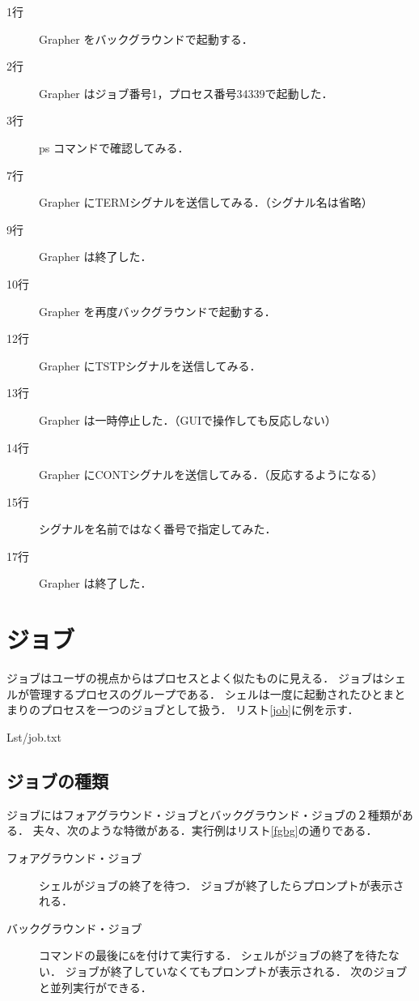

\begin{description}
\item[1行] Grapher をバックグラウンドで起動する．
\item[2行] Grapher はジョブ番号1，プロセス番号34339で起動した．
\item[3行] ps コマンドで確認してみる．
\item[7行] Grapher にTERMシグナルを送信してみる．（シグナル名は省略）
\item[9行] Grapher は終了した．
\item[10行] Grapher を再度バックグラウンドで起動する．
\item[12行] Grapher にTSTPシグナルを送信してみる．
\item[13行] Grapher は一時停止した．（GUIで操作しても反応しない）
\item[14行] Grapher にCONTシグナルを送信してみる．（反応するようになる）
\item[15行] シグナルを名前ではなく番号で指定してみた．
\item[17行] Grapher は終了した．
\end{description}

\section{ジョブ}
ジョブはユーザの視点からはプロセスとよく似たものに見える．
ジョブはシェルが管理するプロセスのグループである．
シェルは一度に起動されたひとまとまりのプロセスを一つのジョブとして扱う．
リスト\ref{job}に例を示す．


                {Lst/job.txt}

\subsection{ジョブの種類}
ジョブにはフォアグラウンド・ジョブとバックグラウンド・ジョブの２種類がある．
夫々、次のような特徴がある．実行例はリスト\ref{fgbg}の通りである．

\begin{description}
\item[フォアグラウンド・ジョブ]
シェルがジョブの終了を待つ．
ジョブが終了したらプロンプトが表示される．

\item[バックグラウンド・ジョブ]
コマンドの最後に\texttt{\&}を付けて実行する．
シェルがジョブの終了を待たない．
ジョブが終了していなくてもプロンプトが表示される．
次のジョブと並列実行ができる．
\end{description}

